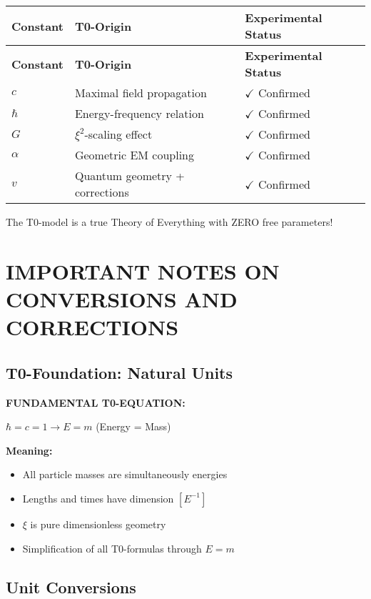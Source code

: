 \documentclass[12pt,a4paper]{article}
\begin{document}
	\begin{longtable}{|p{3cm}|p{5cm}|p{4cm}|}
		\hline
		\textbf{Constant} & \textbf{T0-Origin} & \textbf{Experimental Status} \\
		\hline
		\endfirsthead
		\hline
		\textbf{Constant} & \textbf{T0-Origin} & \textbf{Experimental Status} \\
		\hline
		\endhead
		\(c\) & Maximal field propagation & \(\checkmark\) Confirmed \\
		\hline
		\(\hbar\) & Energy-frequency relation & \(\checkmark\) Confirmed \\
		\hline
		\(G\) & \(\xi^{2}\)-scaling effect & \(\checkmark\) Confirmed \\
		\hline
		\(\alpha\) & Geometric EM coupling & \(\checkmark\) Confirmed \\
		\hline
		\(v\) & Quantum geometry + corrections & \(\checkmark\) Confirmed \\
		\hline
	\end{longtable}
	
	The T0-model is a true Theory of Everything with ZERO free parameters!
	
	\section{IMPORTANT NOTES ON CONVERSIONS AND CORRECTIONS}
	
	\subsection{T0-Foundation: Natural Units}
	
	\textbf{FUNDAMENTAL T0-EQUATION:}
	\begin{center}
		\(\hbar = c = 1 \rightarrow E = m\) (Energy = Mass)
	\end{center}
	
	\textbf{Meaning:}
	\begin{itemize}
		\item All particle masses are simultaneously energies
		\item Lengths and times have dimension \([E^{-1}]\)
		\item \(\xi\) is pure dimensionless geometry
		\item Simplification of all T0-formulas through \(E=m\)
	\end{itemize}
	
	\subsection{Unit Conversions}
	
\end{document}
